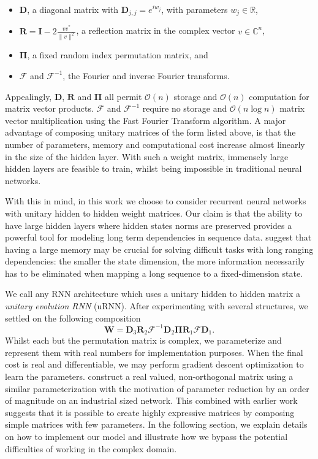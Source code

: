 \documentclass{article} %
\newcommand{\matr}[1]{\mathbf{#1}}
\newcommand\RR{\mathbb{R}}
\begin{document}
\begin{itemize}
  \item $\matr{D}$, a diagonal matrix with $\matr{D}_{j,j} = e^{i w_j}$, with parameters $w_j \in \RR$,
  \item $\matr{R} = \matr{I} - 2 \frac{v v^*}{\|v\|^2}$, a reflection matrix in the complex vector 
  $v \in \mathbb{C}^n$, 
  \item $\matr{\Pi}$, a fixed random index permutation matrix, and
  \item $\mathcal{F}$ and $\mathcal{F}^{-1}$, the Fourier and inverse Fourier transforms.
\end{itemize}

Appealingly, $\matr{D}$, $\matr{R}$ and $\matr{\Pi}$ all permit $\mathcal{O}(n)$ storage and 
$\mathcal{O}(n)$ computation for matrix vector products. $\mathcal{F}$ and $\mathcal{F}^{-1}$
require no storage and $\mathcal{O}(n \log n)$ matrix vector multiplication using the Fast Fourier
Transform algorithm. A major advantage of composing unitary matrices of the form listed above, is 
that the number of parameters, memory and computational cost increase almost linearly in the size
of the hidden layer. With such a weight matrix, immensely large hidden layers are feasible to train, 
whilst being impossible in traditional neural networks. 
 
With this in mind, in this work we choose to consider recurrent neural networks with unitary hidden to hidden
weight matrices. Our claim is that the ability to have large hidden layers where hidden 
states norms are preserved provides a powerful tool for modeling long term dependencies in sequence data. 
\cite{Yoshua94} suggest that having a large memory may be crucial for solving 
difficult tasks with long ranging dependencies: the smaller the state dimension, the more
information necessarily has to be eliminated when mapping a long sequence to a fixed-dimension state.

We call any RNN architecture which uses a unitary hidden to hidden matrix a \textit{unitary evolution RNN}
(uRNN). After experimenting with several structures, we settled on the following composition
\vspace{-0.25mm}
\begin{equation} 
\matr{W} = \matr{D}_3 \matr{R}_2 \mathcal{F}^{-1} \matr{D}_2 \matr{\Pi} \matr{R}_1 \mathcal{F} \matr{D}_1 .
\end{equation}
\vspace{-0.5mm}
Whilst each but the permutation matrix is complex, we parameterize and represent them with real numbers
for implementation purposes. When the final cost is real and differentiable, we may perform gradient descent 
optimization to learn the parameters.
\cite{dfc} construct a real valued, non-orthogonal matrix using a similar parameterization with the motivation
of parameter reduction by an order of magnitude on an industrial sized network. This combined with earlier
work \citep{fastfood} suggests that it is possible to create highly expressive matrices by composing simple
matrices with few parameters. In the following section, we explain details on how to implement our model 
and illustrate how we bypass the
potential difficulties of working in the complex domain.
\end{document}
